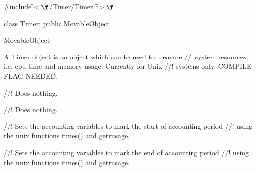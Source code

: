 
\indent \#include \f$<\tilde{}\f$/Timer/Timer.h\f$>\f$

\indent class Timer: public MovableObject

\indent MovableObject
\indent{}

\indent A Timer object is an object which can be used to measure
//! system resources, i.e. cpu time and memory usage. Currently for Unix
//! systems only. COMPILE FLAG NEEDED.


//! Does nothing.

//! Does nothing.

//! Sets the accounting variables to mark the start of accounting period
//! using the unix functions times() and \p getrusage.

//! Sets the accounting variables to mark the end of accounting period
//! using the unix functions times() and \p getrusage.



